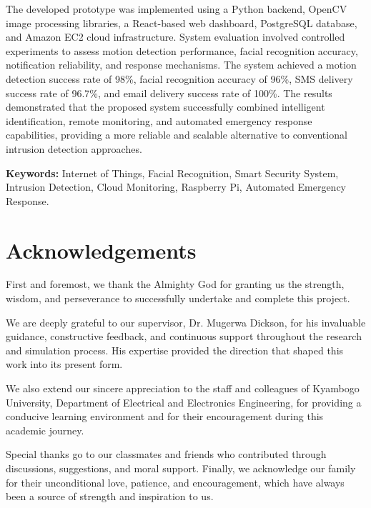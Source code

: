 \documentclass[12pt,a4paper,oneside]{report}
\begin{document}
The developed prototype was implemented using a Python backend, OpenCV image processing libraries, a React-based web dashboard, PostgreSQL database, and Amazon EC2 cloud infrastructure. System evaluation involved controlled experiments to assess motion detection performance, facial recognition accuracy, notification reliability, and response mechanisms. The system achieved a motion detection success rate of 98\%, facial recognition accuracy of 96\%, SMS delivery success rate of 96.7\%, and email delivery success rate of 100\%. The results demonstrated that the proposed system successfully combined intelligent identification, remote monitoring, and automated emergency response capabilities, providing a more reliable and scalable alternative to conventional intrusion detection approaches.

\vspace{0.5cm}
\noindent\textbf{Keywords:} Internet of Things, Facial Recognition, Smart Security System, Intrusion Detection, Cloud Monitoring, Raspberry Pi, Automated Emergency Response.

\clearpage
\chapter*{Acknowledgements}

First and foremost, we thank the Almighty God for granting us the strength, wisdom, and perseverance to successfully undertake and complete this project.

We are deeply grateful to our supervisor, Dr. Mugerwa Dickson, for his invaluable guidance, constructive feedback, and continuous support throughout the research and simulation process. His expertise provided the direction that shaped this work into its present form.

We also extend our sincere appreciation to the staff and colleagues of Kyambogo University, Department of Electrical and Electronics Engineering, for providing a conducive learning environment and for their encouragement during this academic journey.

Special thanks go to our classmates and friends who contributed through discussions, suggestions, and moral support. Finally, we acknowledge our family for their unconditional love, patience, and encouragement, which have always been a source of strength and inspiration to us.
\end{document}
